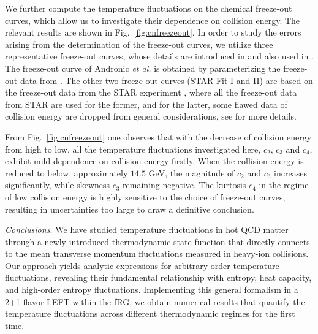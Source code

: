 \documentclass[aps,twocolumn,prd,superscriptaddress,nofootinbib,floatfix]{revtex4-2}
\begin{document}
{\color{blue}
We further compute the temperature fluctuations on the chemical freeze-out curves, which allow us to investigate their dependence on collision energy. The relevant results are shown in Fig.~\ref{fig:cnfreezeout}. In order to study the errors arising from the determination of the freeze-out curves, we utilize three representative freeze-out curves, whose details are introduced in \cite{Fu:2021oaw} and also used in \cite{Fu:2023lcm}. The freeze-out curve of Andronic {\it et al.} is obtained by parameterizing the freeze-out data from \cite{Andronic:2017pug}. The other two freeze-out curves (STAR Fit I and II) are based on the freeze-out data from the STAR experiment \cite{Adamczyk:2017iwn}, where all the freeze-out data from STAR are used for the former, and for the latter, some flawed data of collision energy are dropped from general considerations, see \cite{Fu:2021oaw} for more details.

From Fig.~\ref{fig:cnfreezeout} one observes that with the decrease of collision energy from high to low, all the temperature fluctuations investigated here, $c_2$, $c_3$ and $c_4$, exhibit mild dependence on collision energy firstly. When the collision energy is reduced to below, approximately $14.5$ GeV, the magnitude of $c_2$ and $c_3$ increases significantly, while skewness $c_3$ remaining negative. The kurtosis $c_4$ in the regime of low collision energy is highly sensitive to the choice of freeze-out curves, resulting in uncertainties too large to draw a definitive conclusion.

}


\textit{Conclusions.}\label{sec:conclusion} We have studied temperature fluctuations in hot QCD matter through a newly introduced thermodynamic state function that directly connects to the mean transverse momentum fluctuations measured in heavy-ion collisions. Our approach yields analytic expressions for arbitrary-order temperature fluctuations, revealing their fundamental relationship with entropy, heat capacity, and high-order entropy fluctuations. Implementing this general formalism in a 2+1 flavor LEFT within the fRG, we obtain numerical results that quantify the temperature fluctuations across different thermodynamic regimes for the first time.
\end{document}

